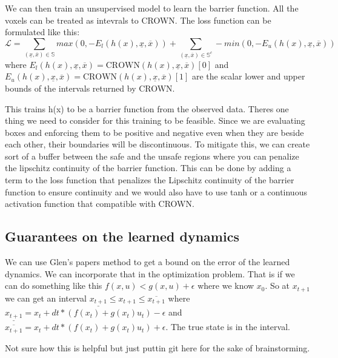 \documentclass[12pt]{article}
\begin{document}
We can then train an unsupervised model to learn the barrier function. All the voxels can be treated as intevrals to CROWN. The loss function can be formulated like this:
\[\mathcal{L} = \sum_{(\underline{x},\overline{x}) \in \mathbb{S}} max(0, -E_{l}(h(x), \underline{x}, \overline{x})) + \sum_{(\underline{x},\overline{x}) \in \mathbb{S}^c} -min(0, -E_{u}(h(x), \underline{x}, \overline{x}))\]
where \(E_{l}(h(x), \underline{x}, \overline{x}) = \text{CROWN}(h(x), \underline{x}, \overline{x})[0]\) and \(E_{u}(h(x), \underline{x}, \overline{x}) = \text{CROWN}(h(x), \underline{x}, \overline{x})[1]\) are the scalar lower and upper bounds of the intervals returned by CROWN.

This trains h(x) to be a barrier function from the observed data. Theres one thing we need to consider for this training to be feasible. Since we are evaluating boxes and enforcing them to be positive and negative even when they are beside each other, their boundaries will be discontinuous. 
To mitigate this, we can create sort of a buffer between the safe and the unsafe regions where you can penalize the lipschitz continuity of the barrier function. This can be done by adding a term to the loss function that penalizes the Lipschitz continuity of the barrier function to ensure continuity and we would also have to use tanh or 
a continuous activation function that compatible with CROWN. 

\subsection{Guarantees on the learned dynamics}
We can use Glen's papers method to get a bound on the error of the learned dynamics. We can incorporate that in the optimization problem. That is if we can do something like this \(f(x,u) < g(x,u) + \epsilon\) where we know \(x_{0}\).
So at \(x_{t+1}\) we can get an interval \(\underline{x_{t+1}} \leq x_{t+1} \leq \overline{x_{t+1}}\) where \(\underline{x_{t+1}} = x_{t} + dt * (f(x_{t}) + g(x_{t})u_{t}) - \epsilon\) and \(\overline{x_{t+1}} = x_{t} + dt * (f(x_{t}) + g(x_{t})u_{t}) + \epsilon\). The true state is in the interval.

Not sure how this is helpful but just puttin git here for the sake of brainstorming. 

\end{document}
